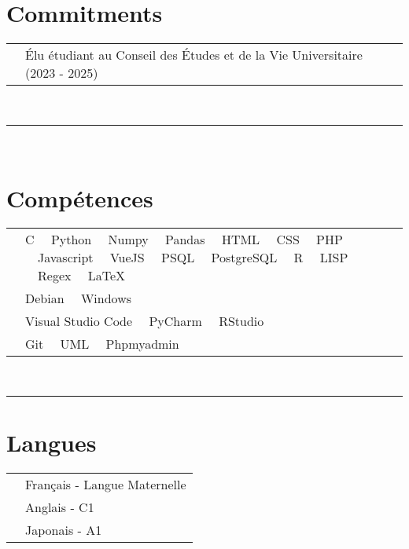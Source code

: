 \documentclass[oneside]{article}
\begin{document}
{\begin{minipage}[t][\textheight-2\fboxsep-2\fboxrule][t]{\dimexpr0.40\textwidth-2\fboxrule-2\fboxsep\relax}
        \section*{\large Commitments}
        \begin{tabularx}{\textwidth}{cY}
            & Élu étudiant au Conseil des Études et de la Vie Universitaire (2023 - 2025)
        \end{tabularx}
        \vspace{7pt} \\
        \rule{\linewidth}{0.4pt} \\
        \section*{\large Compétences}
        \begin{tabularx}{\textwidth}{cY}
            \faCode{}        & C \ \ Python \ \ Numpy \ \ Pandas \ \ HTML \ \ CSS \ \ PHP \ \ Javascript \ \ VueJS \ \ PSQL \ \ PostgreSQL \ \ R \ \ LISP \ \ Regex \ \ LaTeX \\
            \faCogs{}        & Debian \ \ Windows \\
            \faLaptopCode{}  & Visual Studio Code \ \ PyCharm \ \ RStudio \\
            \faToolbox{}     & Git \ \ UML \ \ Phpmyadmin
        \end{tabularx}
        \vspace{1pt} \\
        \rule{\linewidth}{0.4pt}
        
        \section*{\large Langues}
        \begin{tabularx}{\textwidth}{cY}
            \faLanguage{} & Français - Langue Maternelle \\
            \faLanguage{} & Anglais - C1 \\
            \faLanguage{} & Japonais - A1 \\
        \end{tabularx}
        \vspace{.3cm}
        \\
        

\end{minipage}}
\end{document}
